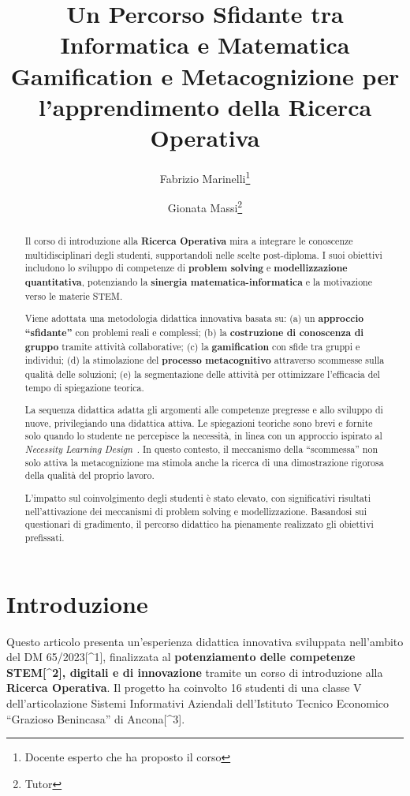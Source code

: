 \documentclass[withtimes]{easychair}
\title{Un Percorso Sfidante tra Informatica e Matematica\\
Gamification e Metacognizione per l'apprendimento della Ricerca
Operativa}
\author{
Fabrizio Marinelli\inst{1}\thanks{Docente esperto che ha proposto il corso}
\and
Gionata Massi\inst{2}\thanks{Tutor}
}
\institute{
  Dipartimento di Ingegneria dell'Informazione
  \\Universit\`a Politecnica delle Marche
  Ancona, Italia\\
  \email{fabrizio.marinelli@staff.univpm.it}
\and
   Istituto di Istruzione Superiore Savoia Benincasa\\
   Ancona, Italia\\
   \email{gionata.massi@savoiabenincasa.it}
 }
\begin{document}
\maketitle


\begin{abstract}
Il corso di introduzione alla \textbf{Ricerca Operativa} mira a
integrare le conoscenze multidisciplinari degli studenti, supportandoli
nelle scelte post-diploma. I suoi obiettivi includono lo sviluppo di
competenze di \textbf{problem solving} e \textbf{modellizzazione
quantitativa}, potenziando la \textbf{sinergia matematica-informatica} e
la motivazione verso le materie STEM.

Viene adottata una metodologia didattica innovativa basata su: (a) un
\textbf{approccio ``sfidante''} con problemi reali e complessi; (b) la
\textbf{costruzione di conoscenza di gruppo} tramite attività
collaborative; (c) la \textbf{gamification} con sfide tra gruppi e
individui; (d) la stimolazione del \textbf{processo metacognitivo}
attraverso scommesse sulla qualità delle soluzioni; (e) la segmentazione
delle attività per ottimizzare l'efficacia del tempo di spiegazione
teorica.

La sequenza didattica adatta gli argomenti alle competenze pregresse e
allo sviluppo di nuove, privilegiando una didattica attiva. Le
spiegazioni teoriche sono brevi e fornite solo quando lo studente ne
percepisce la necessità, in linea con un approccio ispirato al
\emph{Necessity Learning Design}~\cite{Sbaraglia}. In questo contesto, il meccanismo
della ``scommessa'' non solo attiva la metacognizione ma stimola anche
la ricerca di una dimostrazione rigorosa della qualità del
proprio lavoro.

L'impatto sul coinvolgimento degli studenti è stato elevato, con
significativi risultati nell'attivazione dei meccanismi di problem
solving e modellizzazione. Basandosi sui questionari di gradimento, il
percorso didattico ha pienamente realizzato gli obiettivi prefissati.
\end{abstract}

\section{Introduzione}\label{sect:introduzione}

Questo articolo presenta un'esperienza didattica innovativa sviluppata
nell'ambito del DM 65/2023{[}\^{}1{]}, finalizzata al
\textbf{potenziamento delle competenze STEM{[}\^{}2{]}, digitali e di
innovazione} tramite un corso di introduzione alla \textbf{Ricerca
Operativa}. Il progetto ha coinvolto 16 studenti di una classe V
dell'articolazione Sistemi Informativi Aziendali dell'Istituto Tecnico
Economico ``Grazioso Benincasa'' di Ancona{[}\^{}3{]}.
\end{document}
